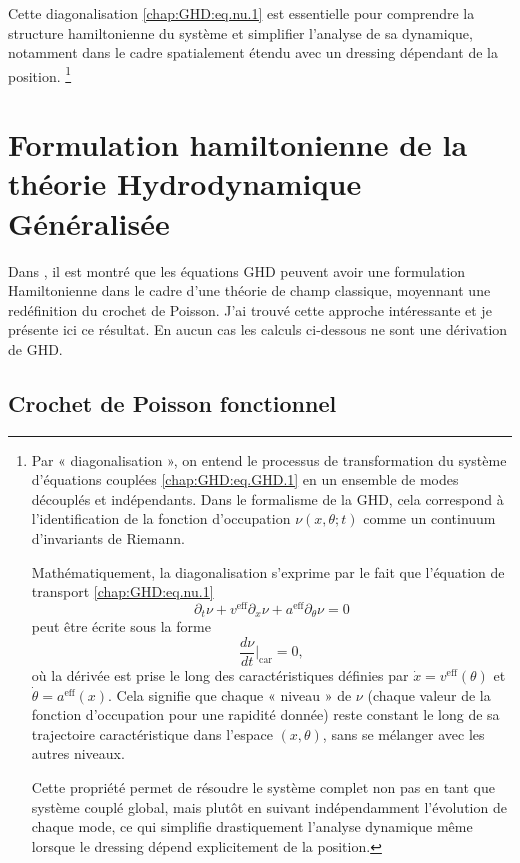 \medskip

Cette diagonalisation \eqref{chap:GHD:eq.nu.1} est essentielle pour comprendre la structure hamiltonienne du système et simplifier l'analyse de sa dynamique, notamment dans le cadre spatialement étendu avec un dressing dépendant de la position. 
\footnote{
Par « diagonalisation », on entend le processus de transformation du système d'équations couplées \eqref{chap:GHD:eq.GHD.1} en un ensemble de modes découplés et indépendants. Dans le formalisme de la GHD, cela correspond à l'identification de la fonction d'occupation $\nu(x,\theta;t)$ comme un continuum d'invariants de Riemann. 

Mathématiquement, la diagonalisation s'exprime par le fait que l'équation de transport \eqref{chap:GHD:eq.nu.1}
\[
\partial_t\nu + v^{\mathrm{eff}}\partial_x\nu + a^{\mathrm{eff}}\partial_\theta\nu = 0
\]
peut être écrite sous la forme
\[
\frac{d\nu}{dt}\bigg|_{\text{car}} = 0,
\]
où la dérivée est prise le long des caractéristiques définies par $\dot{x} = v^{\mathrm{eff}}(\theta)$ et $\dot{\theta} = a^{\mathrm{eff}}(x)$. Cela signifie que chaque « niveau » de $\nu$ (chaque valeur de la fonction d'occupation pour une rapidité donnée) reste constant le long de sa trajectoire caractéristique dans l'espace $(x,\theta)$, sans se mélanger avec les autres niveaux. 

Cette propriété permet de résoudre le système complet non pas en tant que système couplé global, mais plutôt en suivant indépendamment l'évolution de chaque mode, ce qui simplifie drastiquement l'analyse dynamique même lorsque le dressing dépend explicitement de la position.
}

\section{Formulation hamiltonienne de la théorie Hydrodynamique Généralisée}

Dans  \cite{bonnemain2024hamiltonian}, il est montré que les équations \gls{GHD} peuvent
avoir une formulation Hamiltonienne dans le cadre d'une théorie de champ classique,
moyennant une redéfinition du crochet de Poisson. J'ai trouvé cette approche intéressante
et je présente ici ce résultat. En aucun cas les calculs ci-dessous ne sont une dérivation de \gls{GHD}.


\subsection{Crochet de Poisson fonctionnel}

